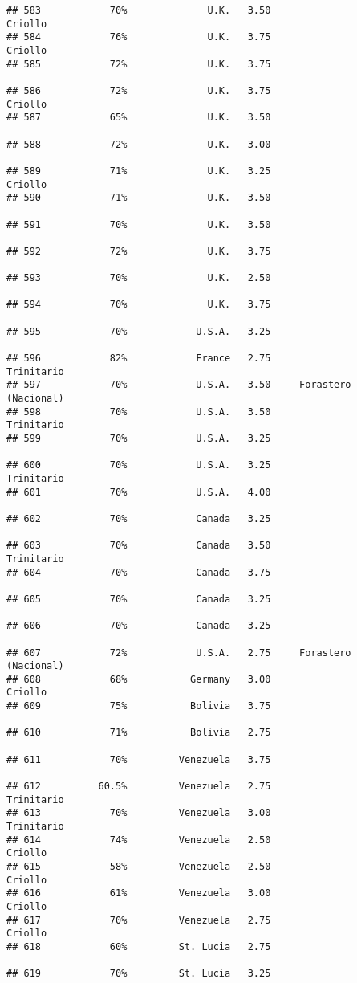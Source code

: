 \documentclass[
]{article}
\begin{document}
\begin{verbatim}
## 583            70%              U.K.   3.50                  Criollo
## 584            76%              U.K.   3.75                  Criollo
## 585            72%              U.K.   3.75                         
## 586            72%              U.K.   3.75                  Criollo
## 587            65%              U.K.   3.50                         
## 588            72%              U.K.   3.00                         
## 589            71%              U.K.   3.25                  Criollo
## 590            71%              U.K.   3.50                         
## 591            70%              U.K.   3.50                         
## 592            72%              U.K.   3.75                         
## 593            70%              U.K.   2.50                         
## 594            70%              U.K.   3.75                         
## 595            70%            U.S.A.   3.25                         
## 596            82%            France   2.75               Trinitario
## 597            70%            U.S.A.   3.50     Forastero (Nacional)
## 598            70%            U.S.A.   3.50               Trinitario
## 599            70%            U.S.A.   3.25                         
## 600            70%            U.S.A.   3.25               Trinitario
## 601            70%            U.S.A.   4.00                         
## 602            70%            Canada   3.25                         
## 603            70%            Canada   3.50               Trinitario
## 604            70%            Canada   3.75                         
## 605            70%            Canada   3.25                         
## 606            70%            Canada   3.25                         
## 607            72%            U.S.A.   2.75     Forastero (Nacional)
## 608            68%           Germany   3.00                  Criollo
## 609            75%           Bolivia   3.75                         
## 610            71%           Bolivia   2.75                         
## 611            70%         Venezuela   3.75                         
## 612          60.5%         Venezuela   2.75               Trinitario
## 613            70%         Venezuela   3.00               Trinitario
## 614            74%         Venezuela   2.50                  Criollo
## 615            58%         Venezuela   2.50                  Criollo
## 616            61%         Venezuela   3.00                  Criollo
## 617            70%         Venezuela   2.75                  Criollo
## 618            60%         St. Lucia   2.75                         
## 619            70%         St. Lucia   3.25                         

\end{verbatim}
\end{document}
